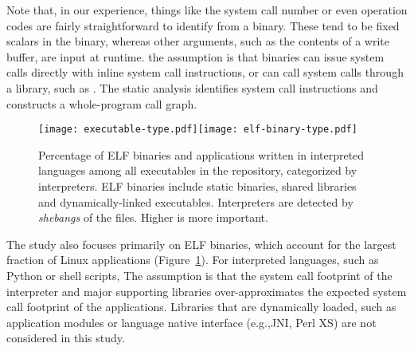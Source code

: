 Note that, in our experience, things like the system call number or even operation codes are fairly straightforward
to identify from a binary.  These tend to be fixed scalars in the binary, whereas other arguments, such as the contents of a write buffer,
are input at runtime.
the assumption is that binaries can issue system calls directly with inline system call instructions, or can call system calls through a library, such as \libc{}.
The static analysis identifies system call instructions and constructs a whole-program call graph.

\begin{figure}[t!]
\centering
\texttt{[image: executable-type.pdf]}\texttt{[image: elf-binary-type.pdf]}
\vspace{-0.5in}
\footnotesize
\caption{Percentage of ELF binaries and applications written in interpreted languages among all executables in the \osdist{} repository, categorized by interpreters. ELF binaries include static binaries, shared libraries and dynamically-linked executables. Interpreters are detected by {\em shebangs} of the files. Higher is more important.}
\label{fig:syspop:executable-type}
\end{figure}

The study also focuses primarily on ELF binaries, which account for the largest fraction of Linux applications
(Figure~\ref{fig:syspop:executable-type}).
For interpreted languages, such as Python or shell scripts,
The assumption is that the system call footprint of the interpreter and major supporting libraries over-approximates the expected system call footprint of the applications.
Libraries that are dynamically loaded, such as application modules or
language native interface (e.g.,JNI, Perl XS) are not considered in this study. 


